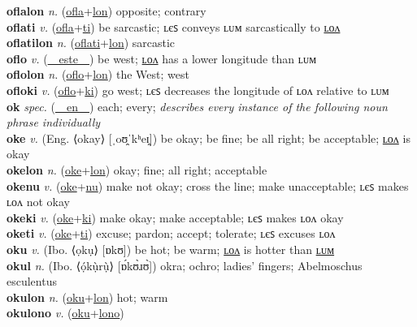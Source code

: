 \textbf{oflalon} \textit{n.} (\hyperref[ofla]{ofla}+\hyperref[lon]{lon})
opposite; contrary \label{oflalon} \\
\textbf{oflati} \textit{v.} (\hyperref[ofla]{ofla}+\hyperref[ti]{ti})
be sarcastic; ʟєꜱ conveys ʟᴜᴍ sarcastically to \hyperref[oflatilon]{ʟᴏᴧ} \label{oflati} \\
\textbf{oflatilon} \textit{n.} (\hyperref[oflati]{oflati}+\hyperref[lon]{lon})
sarcastic \label{oflatilon} \\
\textbf{oflo} \textit{v.} (\hyperref[este]{~~este~~})
be west; \hyperref[oflolon]{ʟᴏᴧ} has a lower longitude than ʟᴜᴍ \label{oflo} \\
\textbf{oflolon} \textit{n.} (\hyperref[oflo]{oflo}+\hyperref[lon]{lon})
the West; west \label{oflolon} \\
\textbf{ofloki} \textit{v.} (\hyperref[oflo]{oflo}+\hyperref[ki]{ki})
go west; ʟєꜱ decreases the longitude of ʟᴏᴧ relative to ʟᴜᴍ \label{ofloki} \\
\textbf{ok} \textit{spec.} (\hyperref[en]{~~en~~})
each; every; \textit{describes every instance of the following noun phrase individually} \label{ok} \\
\textbf{oke} \textit{v.} (Eng. ⟨okay⟩ [ˌoʊ̯ˈkʰeɪ̯])
be okay; be fine; be all right; be acceptable; \hyperref[okelon]{ʟᴏᴧ} is okay \label{oke} \\
\textbf{okelon} \textit{n.} (\hyperref[oke]{oke}+\hyperref[lon]{lon})
okay; fine; all right; acceptable \label{okelon} \\
\textbf{okenu} \textit{v.} (\hyperref[oke]{oke}+\hyperref[nu]{nu})
make not okay; cross the line; make unacceptable; ʟєꜱ makes ʟᴏᴧ not okay \label{okenu} \\
\textbf{okeki} \textit{v.} (\hyperref[oke]{oke}+\hyperref[ki]{ki})
make okay; make acceptable; ʟєꜱ makes ʟᴏᴧ okay \label{okeki} \\
\textbf{oketi} \textit{v.} (\hyperref[oke]{oke}+\hyperref[ti]{ti})
excuse; pardon; accept; tolerate; ʟєꜱ excuses ʟᴏᴧ \label{oketi} \\
\textbf{oku} \textit{v.} (Ibo. ⟨ọkụ⟩ [ɒkʊ])
be hot; be warm; \hyperref[okulon]{ʟᴏᴧ} is hotter than \hyperref[okulum]{ʟᴜᴍ} \label{oku} \\
\textbf{okul} \textit{n.} (Ibo. ⟨ọ́kụ̀rụ̀⟩ [ɒ́kʊ̀ɹʊ̀])
okra; ochro; ladies’ fingers; Abelmoschus esculentus \label{okul} \\
\textbf{okulon} \textit{n.} (\hyperref[oku]{oku}+\hyperref[lon]{lon})
hot; warm \label{okulon} \\
\textbf{okulono} \textit{v.} (\hyperref[oku]{oku}+\hyperref[lono]{lono})
